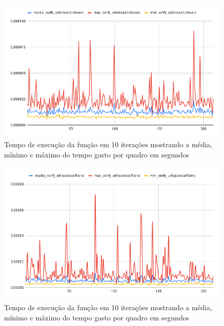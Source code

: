 \begin{figure}[H]
	\centering
	\caption{Tempo de execução da função  em 10 iterações mostrando a média, mínimo e máximo do tempo gasto por quadro em segundos}
	\includegraphics[scale=0.45]{figuras/grafico/extensaoCotovelo.png}
\end{figure}


\begin{figure}[H]
	\centering
	\caption{Tempo de execução da função  em 10 iterações mostrando a média, mínimo e máximo do tempo gasto por quadro em segundos}
	\includegraphics[scale=0.55]{figuras/grafico/ultrapassarBarra.png}
\end{figure}


